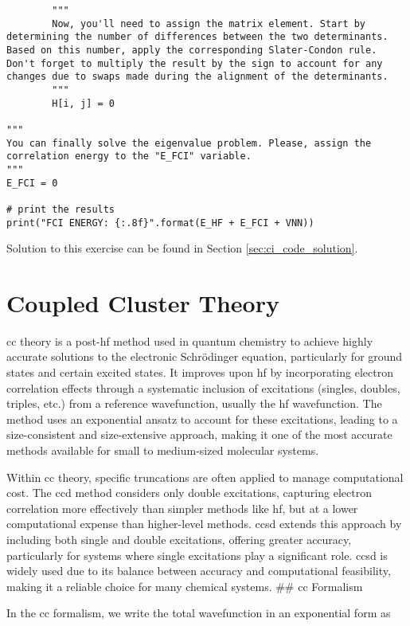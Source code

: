 \begin{lstlisting}
        """
        Now, you'll need to assign the matrix element. Start by determining the number of differences between the two determinants. Based on this number, apply the corresponding Slater-Condon rule. Don't forget to multiply the result by the sign to account for any changes due to swaps made during the alignment of the determinants.
        """
        H[i, j] = 0

"""
You can finally solve the eigenvalue problem. Please, assign the correlation energy to the "E_FCI" variable.
"""
E_FCI = 0

# print the results
print("FCI ENERGY: {:.8f}".format(E_HF + E_FCI + VNN))
\end{lstlisting}

Solution to this exercise can be found in Section \ref{sec:ci_code_solution}.
\chapter{Coupled Cluster Theory}

\acrshort{cc} theory is a \acrshort{post-hf} method used in quantum chemistry to achieve highly accurate solutions to the electronic Schrödinger equation, particularly for ground states and certain excited states. It improves upon \acrshort{hf} by incorporating electron correlation effects through a systematic inclusion of excitations (singles, doubles, triples, etc.) from a reference wavefunction, usually the \acrshort{hf} wavefunction. The method uses an exponential ansatz to account for these excitations, leading to a size-consistent and size-extensive approach, making it one of the most accurate methods available for small to medium-sized molecular systems.

Within \acrshort{cc} theory, specific truncations are often applied to manage computational cost. The \acrshort{ccd} method considers only double excitations, capturing electron correlation more effectively than simpler methods like \acrshort{hf}, but at a lower computational expense than higher-level methods. \acrshort{ccsd} extends this approach by including both single and double excitations, offering greater accuracy, particularly for systems where single excitations play a significant role. \acrshort{ccsd} is widely used due to its balance between accuracy and computational feasibility, making it a reliable choice for many chemical systems. \#\# \acrshort{cc} Formalism

In the \acrshort{cc} formalism, we write the total wavefunction in an exponential form as

